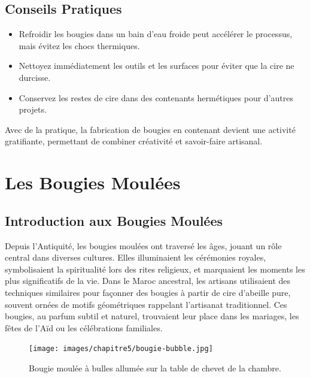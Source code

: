 \documentclass[11pt,fleqn,onecolumn,oneside]{book}
\begin{document}
\section{Conseils Pratiques}
\begin{itemize}
    \item Refroidir les bougies dans un bain d’eau froide peut accélérer le processus, mais évitez les chocs thermiques.
    \item Nettoyez immédiatement les outils et les surfaces pour éviter que la cire ne durcisse.
    \item Conservez les restes de cire dans des contenants hermétiques pour d’autres projets.
\end{itemize}

\begin{remark}
Avec de la pratique, la fabrication de bougies en contenant devient une activité gratifiante, permettant de combiner créativité et savoir-faire artisanal.
\end{remark}

\chapter{Les Bougies Moulées}

\section{Introduction aux Bougies Moulées}


Depuis l’Antiquité, les bougies moulées ont traversé les âges, jouant un rôle central dans diverses cultures. Elles illuminaient les cérémonies royales, symbolisaient la spiritualité lors des rites religieux, et marquaient les moments les plus significatifs de la vie. Dans le Maroc ancestral, les artisans utilisaient des techniques similaires pour façonner des bougies à partir de cire d’abeille pure, souvent ornées de motifs géométriques rappelant l'artisanat traditionnel. Ces bougies, au parfum subtil et naturel, trouvaient leur place dans les mariages, les fêtes de l’Aïd ou les célébrations familiales.

\begin{figure}[htbp]
    \centering
    \texttt{[image: images/chapitre5/bougie-bubble.jpg]}
    \caption{Bougie moulée à bulles allumée sur la table de chevet de la chambre.}
    \label{fig:process_coloration}
\end{figure}
\end{document}
